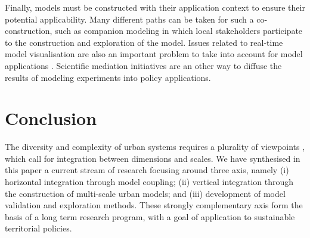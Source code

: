 Finally, models must be constructed with their application context to ensure their potential applicability. Many different paths can be taken for such a co-construction, such as companion modeling \cite{drogoul2015agent} in which local stakeholders participate to the construction and exploration of the model. Issues related to real-time model visualisation are also an important problem to take into account for model applications \cite{milton2019accelerating}. Scientific mediation initiatives are an other way to diffuse the results of modeling experiments into policy applications.



\section{Conclusion}

The diversity and complexity of urban systems requires a plurality of viewpoints \cite{pumain2020conclusion}, which call for integration between dimensions and scales. We have synthesised in this paper a current stream of research focusing around three axis, namely (i) horizontal integration through model coupling; (ii) vertical integration through the construction of multi-scale urban models; and (iii) development of model validation and exploration methods. These strongly complementary axis form the basis of a long term research program, with a goal of application to sustainable territorial policies.








